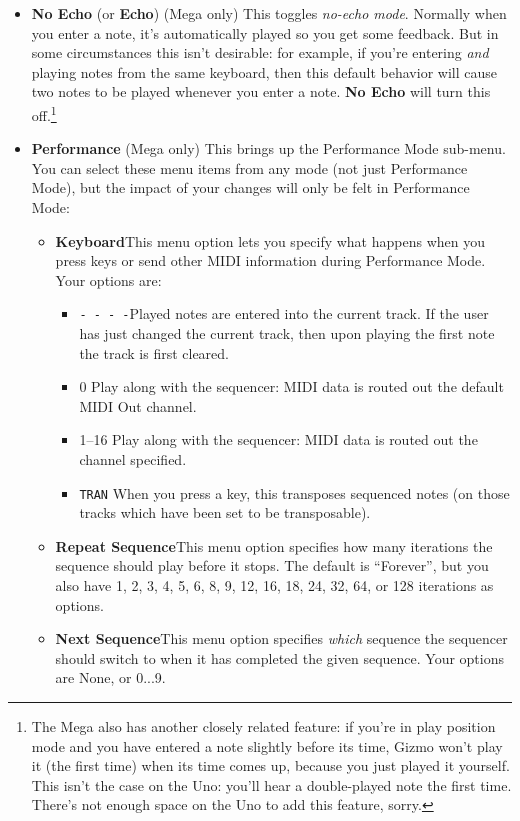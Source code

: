 \documentclass{article}
\begin{document}
\begin{itemize}
\item {\bf No Echo} (or {\bf Echo}) (Mega only) \quad This toggles {\it no-echo mode}.  Normally when you enter a note, it's automatically played so you get some feedback.  But in some circumstances this isn't desirable: for example, if you're entering {\it and} playing notes from the same keyboard, then this default behavior will cause two notes to be played whenever you enter a note.  {\bf No Echo} will turn this off.\footnote{The Mega also has another closely related feature: if you're in play position mode and you have entered a note slightly before its time, Gizmo won't play it (the first time) when its time comes up, because you just played it yourself.  This isn't the case on the Uno: you'll hear a double-played note the first time.  There's not enough space on the Uno to add this feature, sorry.}

\item {\bf Performance} (Mega only) \quad  This brings up the Performance Mode sub-menu.  You can select these menu items from any mode (not just Performance Mode), but the impact of your changes will only be felt in Performance Mode:

\begin{itemize}
\item {\bf Keyboard}\quad  This menu option lets you specify what happens when you press keys or send other MIDI information during Performance Mode.  Your options are:

 \renewcommand\labelitemiii{$\diamond$}
\begin{itemize}
	\item {\texttt{-~-~-~-}}\quad Played notes are entered into the current track.  If the user has just changed the current track, then upon playing the first note the track is first cleared.
	\item {0} \quad Play along with the sequencer: MIDI data is routed out the default MIDI Out channel.
	\item {1--16} \quad Play along with the sequencer: MIDI data is routed out the channel specified.
	\item {\texttt{TRAN}} \quad When you press a key, this transposes sequenced notes (on those tracks which have been set to be transposable).
\end{itemize}

\item {\bf Repeat Sequence}\quad This menu option specifies how many iterations the sequence should play before it stops.  The default is ``Forever'', but you also have 1, 2, 3, 4, 5, 6, 8, 9, 12, 16, 18, 24, 32, 64, or 128 iterations as options.
\item {\bf Next Sequence}\quad This menu option specifies {\it which} sequence the sequencer should switch to when it has completed the given sequence.  Your options are None, or 0...9.
\end{itemize} 


\end{itemize}
\end{document}
